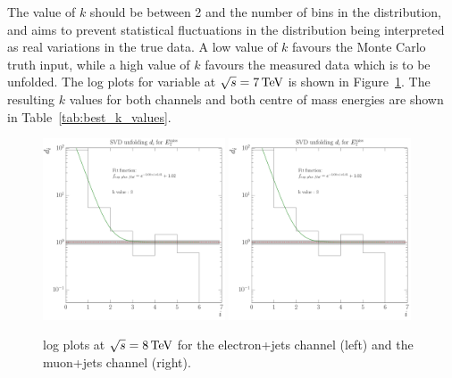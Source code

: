 The value of $k$ should be between 2 and the number of bins in the distribution, and aims to prevent
statistical fluctuations in the distribution being interpreted as real variations in the true data. A low
value of $k$ favours the Monte Carlo truth input, while a high value of $k$ favours the measured data which is
to be unfolded. The log plots for \met variable at $\sqrt{s}=7\,\text{Te\hspace{-.08em}V}$ is shown in
Figure~\ref{fig:d_plots_7TeV}. The resulting $k$ values for both channels and both centre of mass energies are
shown in Table~\ref{tab:best_k_values}.

\begin{figure}[!] %
    \centering
     \includegraphics[width=0.48\textwidth]{Chapters/04_Analysis/04b_XSections/images/unfolding_tests/8TeV/k_values/k_from_d_i_electron_channel_MET_data.pdf}\hfill
     \includegraphics[width=0.48\textwidth]{Chapters/04_Analysis/04b_XSections/images/unfolding_tests/8TeV/k_values/k_from_d_i_electron_channel_MET_data.pdf}\\
	 \caption[log plots at $\roots=8\TeV$]{log plots at $\roots=8\TeV$ for the
	 electron+jets channel (left) and the muon+jets channel (right).} %
     \label{fig:d_plots_7TeV}
\end{figure}

